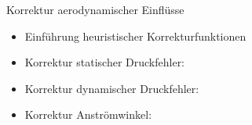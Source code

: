 \documentclass[ucs,9pt]{beamer}
\begin{document}
\begin{frame}{Korrektur aerodynamischer Einflüsse}
	\begin{itemize}
		\item<1-> Einführung heuristischer Korrekturfunktionen
		\item<2-> Korrektur statischer Druckfehler:
	\end{itemize}
	\begin{itemize}
		\item<3-> Korrektur dynamischer Druckfehler:
	\end{itemize}
	\begin{itemize}
		\item<4-> Korrektur Anströmwinkel:
	\end{itemize}
\end{frame}
\end{document}
